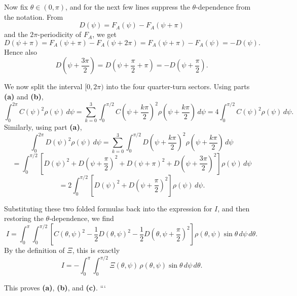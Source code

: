 Now fix \(\theta\in(0,\pi)\), and for the next few lines suppress the \(\theta\)-dependence from the notation. 
From
\[
D(\psi)=F_A(\psi)-F_A(\psi+\pi)
\]
and the \(2\pi\)-periodicity of \(F_A\), we get
\[
D(\psi+\pi)
=
F_A(\psi+\pi)-F_A(\psi+2\pi)
=
F_A(\psi+\pi)-F_A(\psi)
=
-D(\psi).
\]
Hence also
\[
D\!\left(\psi+\frac{3\pi}{2}\right)
=
D\!\left(\psi+\frac{\pi}{2}+\pi\right)
=
-D\!\left(\psi+\frac{\pi}{2}\right).
\]

We now split the interval \([0,2\pi)\) into the four quarter-turn sectors. 
Using parts \textbf{(a)} and \textbf{(b)},
\[
\int_0^{2\pi} C(\psi)^2\rho(\psi)\,d\psi
=
\sum_{k=0}^{3}
\int_0^{\pi/2}
C\!\left(\psi+\frac{k\pi}{2}\right)^2
\rho\!\left(\psi+\frac{k\pi}{2}\right)\,d\psi
=
4\int_0^{\pi/2} C(\psi)^2\rho(\psi)\,d\psi.
\]
Similarly, using part \textbf{(a)},
\[
\int_0^{2\pi} D(\psi)^2\rho(\psi)\,d\psi
=
\sum_{k=0}^{3}
\int_0^{\pi/2}
D\!\left(\psi+\frac{k\pi}{2}\right)^2
\rho\!\left(\psi+\frac{k\pi}{2}\right)\,d\psi
\]
\[
=
\int_0^{\pi/2}
\left[
D(\psi)^2
+
D\!\left(\psi+\frac{\pi}{2}\right)^2
+
D(\psi+\pi)^2
+
D\!\left(\psi+\frac{3\pi}{2}\right)^2
\right]
\rho(\psi)\,d\psi
\]
\[
=
2\int_0^{\pi/2}
\left[
D(\psi)^2
+
D\!\left(\psi+\frac{\pi}{2}\right)^2
\right]
\rho(\psi)\,d\psi.
\]

Substituting these two folded formulas back into the expression for \(I\), and then restoring the \(\theta\)-dependence, we find
\[
I
=
\int_0^\pi\int_0^{\pi/2}
\left[
C(\theta,\psi)^2
-\frac{1}{2}D(\theta,\psi)^2
-\frac{1}{2}D\!\left(\theta,\psi+\frac{\pi}{2}\right)^2
\right]
\rho(\theta,\psi)\sin\theta\,d\psi\,d\theta.
\]
By the definition of \(\Xi\), this is exactly
\[
I
=
-\int_0^\pi\int_0^{\pi/2}
\Xi(\theta,\psi)\,\rho(\theta,\psi)\sin\theta\,d\psi\,d\theta.
\]

This proves \textbf{(a)}, \textbf{(b)}, and \textbf{(c)}.
```